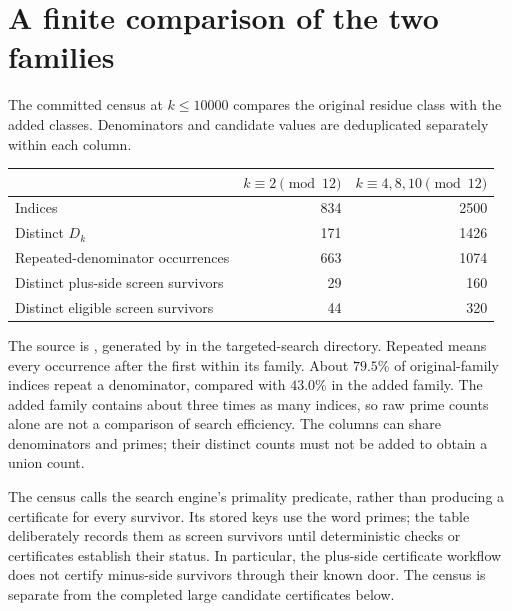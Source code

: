 \documentclass[11pt,a4paper]{article}
\begin{document}
\section{A finite comparison of the two families}
The committed census at $k\le10000$ compares the original residue class
with the added classes. Denominators and candidate values are
deduplicated separately within each column.
\begin{center}
\begin{tabular}{lrr}
\toprule
 & $k\equiv2\pmod{12}$ & $k\equiv4,8,10\pmod{12}$\\
\midrule
Indices & 834 & 2500\\
Distinct $D_k$ & 171 & 1426\\
Repeated-denominator occurrences & 663 & 1074\\
Distinct plus-side screen survivors & 29 & 160\\
Distinct eligible screen survivors & 44 & 320\\
\bottomrule
\end{tabular}
\end{center}
The source is , generated by
 in the targeted-search directory.
Repeated means every occurrence after the first within its family.
About $79.5\%$ of original-family indices repeat a denominator, compared
with $43.0\%$ in the added family. The added family contains about three
times as many indices, so raw prime counts alone are not a comparison
of search efficiency. The columns can share denominators and primes;
their distinct counts must not be added to obtain a union count.

The census calls the search engine's primality predicate, rather than
producing a certificate for every survivor. Its stored keys use the word
primes; the table deliberately records them as screen survivors
until deterministic checks or certificates establish their status.
In particular, the plus-side certificate workflow does not certify
minus-side survivors through their known door. The census is separate
from the completed large candidate certificates below.
\end{document}
